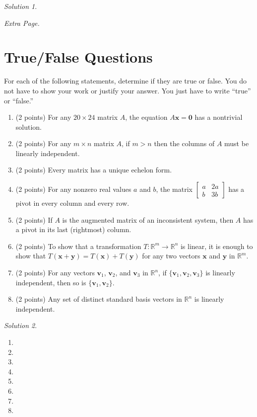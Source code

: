\documentclass{article}
\theoremstyle{remark}
\newtheorem*{solution}{Solution}
\newcommand{\vv}[1]{\mathbf{#1}}
\newcommand{\R}{\mathbb R}
\begin{document}
\begin{solution}
\end{solution}

\pagebreak
\noindent\textit{Extra Page.}

\pagebreak
\section{True/False Questions}

For each of the following statements, determine if they are true or false.
You do not have to show your work or justify your answer. You just have to write ``true'' or ``false.''

\begin{enumerate}
\item (2 points) For any $20 \times 24$ matrix $A$, the equation $A\vv x = \vv 0$ has a nontrivial solution.
\item (2 points) For any $m \times n$ matrix $A$, if $m > n$ then the columns of $A$ must be linearly independent.
\item (2 points) Every matrix has a unique echelon form.
\item (2 points) For any nonzero real values $a$ and $b$, the matrix
  $
  \begin{bmatrix}
    a & 2a \\
    b & 3b
  \end{bmatrix}
  $
  has a pivot in every column and every row.
\item (2 points) If $A$ is the augmented matrix of an inconsistent system, then $A$ has a pivot in its last (rightmost) column.
\item (2 points) To show that a transformation $T: \R^m \to \R^n$ is linear, it is enough to show that $T(\vv x + \vv y) = T(\vv x) + T(\vv y)$ for any two vectors $\vv x$ and $\vv y$ in $\R^m$.
\item (2 points) For any vectors $\vv v_1$, $\vv v_2$, and $\vv v_3$ in $\R^n$, if $\{\vv v_1, \vv v_2, \vv v_3\}$ is linearly independent, then so is $\{\vv v_1, \vv v_2\}$.
\item (2 points) Any set of distinct standard basis vectors in $\mathbb R^n$ is linearly independent.
\end{enumerate}

\begin{solution}
  \hfill
  \begin{enumerate}
  \item
  \item
  \item
  \item
  \item
  \item
  \item
  \item
  \end{enumerate}
\end{solution}
\end{document}
